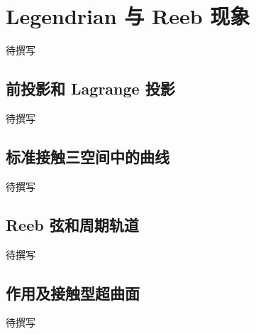 
% 
% 

\section{Legendrian 与 Reeb 现象}
\label{g4:sec:1303}

待撰写

\subsection{前投影和 Lagrange 投影}
\label{g4:subsec:1303:01}
待撰写

\subsection{标准接触三空间中的曲线}
\label{g4:subsec:1303:02}
待撰写

\subsection{Reeb 弦和周期轨道}
\label{g4:subsec:1303:03}
待撰写

\subsection{作用及接触型超曲面}
\label{g4:subsec:1303:04}
待撰写
